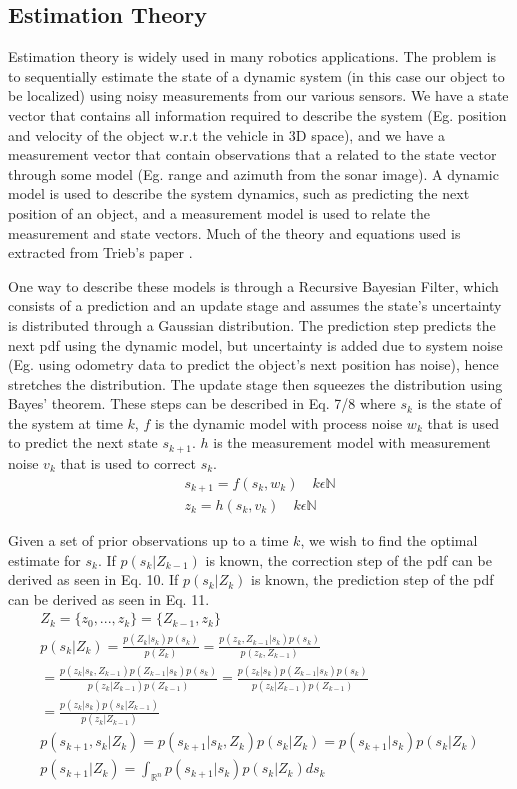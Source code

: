 \documentclass[15pt]{article}
\begin{document}
\subsection{Estimation Theory}

Estimation theory is widely used in many robotics applications. The problem is to sequentially estimate the state of a dynamic system (in this case our object to be localized) using noisy measurements from our various sensors. We have a state vector that contains all information required to describe the system (Eg. position and velocity of the object w.r.t the vehicle in 3D space), and we have a measurement vector that contain observations that a related to the state vector through some model (Eg. range and azimuth from the sonar image). A dynamic model is used to describe the system dynamics, such as predicting the next position of an object, and a measurement model is used to relate the measurement and state vectors. Much of the theory and equations used is extracted from Trieb's paper \cite{Trieb2005}.

One way to describe these models is through a Recursive Bayesian Filter, which consists of a prediction and an update stage and assumes the state's uncertainty is distributed through a Gaussian distribution. The prediction step predicts the next pdf using the dynamic model, but uncertainty is added due to system noise (Eg. using odometry data to predict the object's next position has noise), hence stretches the distribution. The update stage then squeezes the distribution using Bayes' theorem. These steps can be described in Eq. 7/8 where $s_{k}$ is the state of the system at time $k$, $f$ is the dynamic model with process noise $w_{k}$ that is used to predict the next state $s_{k+1}$. $h$ is the measurement model with measurement noise $v_{k}$ that is used to correct $s_{k}$.
\begin{gather}
s_{k+1}=f(s_{k},w_{k})\quad k\epsilon\mathbb{N} \\
z_{k}=h(s_{k},v_{k})\quad k\epsilon\mathbb{N}
\end{gather}

Given a set of prior observations up to a time $k$, we wish to find the optimal estimate for $s_{k}$. If $p(s_{k}|Z_{k-1})$ is known, the correction step of the pdf can be derived as seen in Eq. 10. If $p(s_{k}|Z_{k})$ is known, the prediction step of the pdf can be derived as seen in Eq. 11. 
\begin{gather}
Z_{k}=\{z_{0},...,z_{k}\}=\{Z_{k-1},z_{k}\} \\
p(s_{k}|Z_{k})=\frac{p(Z_{k}|s_{k})p(s_{k})}{p(Z_{k})}=\frac{p(z_{k},Z_{k-1}|s_{k})p(s_{k})}{p(z_{k},Z_{k-1})} \nonumber\\
=\frac{p(z_{k}|s_{k},Z_{k-1})p(Z_{k-1}|s_{k})p(s_{k})}{p(z_{k}|Z_{k-1})p(Z_{k-1})}=\frac{p(z_{k}|s_{k})p(Z_{k-1}|s_{k})p(s_{k})}{p(z_{k}|Z_{k-1})p(Z_{k-1})} \nonumber\\
=\frac{p(z_{k}|s_{k})p(s_{k}|Z_{k-1})}{p(z_{k}|Z_{k-1})} \\
p(s_{k+1},s_{k}|Z_{k})=p(s_{k+1}|s_{k},Z_{k})p(s_{k}|Z_{k})=p(s_{k+1}|s_{k})p(s_{k}|Z_{k}) \nonumber\\
p(s_{k+1}|Z_{k})=\int_{\mathbb{R^{\mathit{n}}}}p(s_{k+1}|s_{k})p(s_{k}|Z_{k})ds_{k}
\end{gather}
\end{document}
